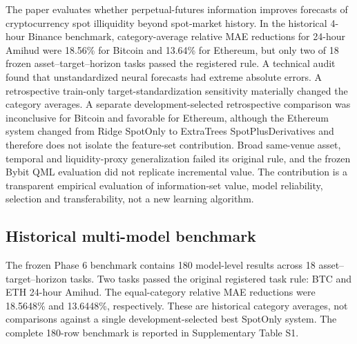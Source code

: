 
The paper evaluates whether perpetual-futures information improves forecasts of cryptocurrency spot illiquidity beyond spot-market history. In the historical 4-hour Binance benchmark, category-average relative MAE reductions for 24-hour Amihud were 18.56\% for Bitcoin and 13.64\% for Ethereum, but only two of 18 frozen asset--target--horizon tasks passed the registered rule. A technical audit found that unstandardized neural forecasts had extreme absolute errors. A retrospective train-only target-standardization sensitivity materially changed the category averages. A separate development-selected retrospective comparison was inconclusive for Bitcoin and favorable for Ethereum, although the Ethereum system changed from Ridge SpotOnly to ExtraTrees SpotPlusDerivatives and therefore does not isolate the feature-set contribution. Broad same-venue asset, temporal and liquidity-proxy generalization failed its original rule, and the frozen Bybit QML evaluation did not replicate incremental value. The contribution is a transparent empirical evaluation of information-set value, model reliability, selection and transferability, not a new learning algorithm.

\subsection{Historical multi-model benchmark}
The frozen Phase 6 benchmark contains 180 model-level results across 18 asset--target--horizon tasks. Two tasks passed the original registered task rule: BTC and ETH 24-hour Amihud. The equal-category relative MAE reductions were 18.5648\% and 13.6448\%, respectively. These are historical category averages, not comparisons against a single development-selected best SpotOnly system. The complete 180-row benchmark is reported in Supplementary Table S1.

